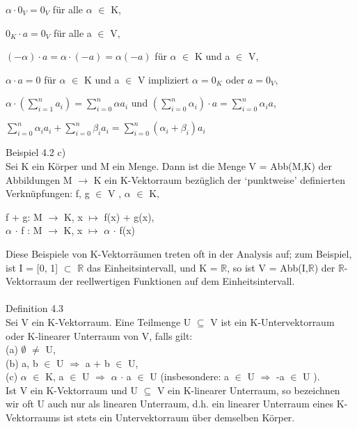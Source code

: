 \begin{compactitem}
\item $\alpha \cdot 0_V = 0_V$ für alle $\alpha$ $\in$ K,
\item $0_K \cdot a = 0_V$  für alle a $\in$ V,
\item $(-\alpha) \cdot a = \alpha \cdot (-a) = \alpha(-a)$ für $\alpha$ $\in$ K und a $\in$ V,
\item $\alpha \cdot a = 0$ für $\alpha$ $\in$ K und a $\in$ V impliziert $\alpha = 0_K$ oder $a = 0_V$,
\item $\alpha \cdot (\sum\nolimits_{i=1}^{n} a_i) = \sum\nolimits_{i=0}^{n} \alpha a_i$ und $(\sum\nolimits_{i=0}^{n}\alpha_i) \cdot a = \sum\nolimits_{i=0}^{n} \alpha_i a$,
\item $\sum\nolimits_{i=0}^{n} \alpha_i a_i + \sum\nolimits_{i=0}^{n} \beta_i a_i = \sum\nolimits_{i=0}^{n} (\alpha_i + \beta_i) a_i$\\
\end{compactitem}
Beispiel 4.2 c)\\
Sei K ein Körper und M ein Menge. Dann ist die Menge V = Abb(M,K) der Abbildungen M $\to$ K ein K-Vektorraum bezüglich der ‘punktweise’ definierten Verknüpfungen: f, g $\in$ V , $\alpha$ $\in$ K,
\begin{center}
f + g: M $\to$ K, x $\mapsto$ f(x) + g(x),\\
$\alpha$ $\cdot$ f : M $\to$ K, x $\mapsto$ $\alpha$ $\cdot$ f(x)
\end{center}
Diese Beispiele von K-Vektorräumen treten oft in der Analysis auf; zum Beispiel, ist I = [0, 1] $\subset$ $\mathbb{R}$ das Einheitsintervall, und K = $\mathbb{R}$, so ist V = Abb(I,$\mathbb{R}$) der $\mathbb{R}$-Vektorraum der reellwertigen Funktionen auf dem Einheitsintervall. \\
\\
Definition 4.3\\
Sei V ein K-Vektorraum. Eine Teilmenge U $\subseteq$ V ist ein K-Untervektorraum oder K-linearer Unterraum von V, falls gilt: \\
(a) $\emptyset$ $\neq$ U, \\
(b) a, b $\in$ U $\Rightarrow$ a + b $\in$ U,\\ 
(c) $\alpha$ $\in$ K, a $\in$ U $\Rightarrow$ $\alpha$ $\cdot$ a $\in$ U (insbesondere: a $\in$ U $\Rightarrow$ -a $\in$ U ).\\ 
Ist V ein K-Vektorraum und U $\subseteq$ V ein K-linearer Unterraum, so bezeichnen wir oft U auch nur als linearen Unterraum, d.h. ein linearer Unterraum eines K-Vektorraums ist stets ein Untervektorraum über demselben Körper. \\
